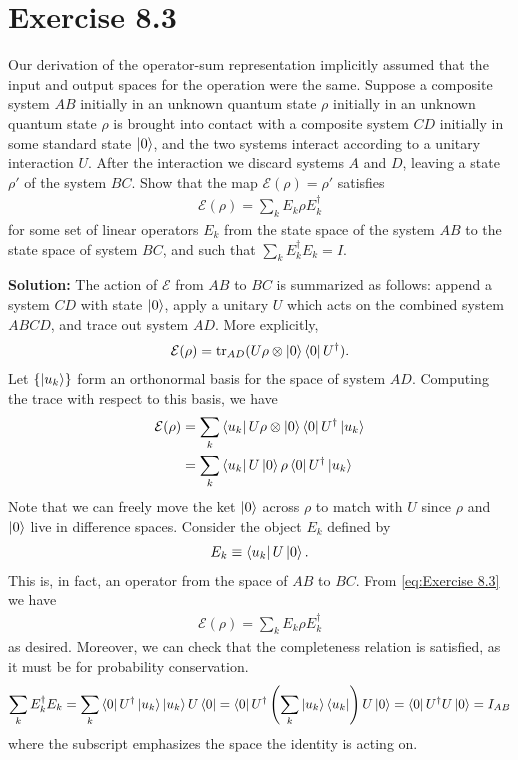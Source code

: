 \documentclass{book}
\newcommand{\mc}[1]{\mathcal{#1}}
\begin{document}
\section*{Exercise 8.3}
    Our derivation of the operator-sum representation implicitly assumed that the input and output spaces for the operation were the same. Suppose a composite system $AB$ initially in an unknown quantum state $\rho$ initially in an unknown quantum state $\rho$ is brought into contact with a composite system $CD$ initially in some standard state $\ket{0}$, and the two systems interact according to a unitary interaction $U$. After the interaction we discard systems $A$ and $D$, leaving a state $\rho'$ of the system $BC$. Show that the map $\mc{E}(\rho) = \rho'$ satisfies
    \begin{align}
        \mc{E}(\rho) = \sum_k E_k \rho E_k^\dagger
    \end{align}
    for some set of linear operators $E_k$ from the state space of the system $AB$ to the state space of system $BC$, and such that $\sum_k E_k^\dagger E_k = I$.
    
    \textbf{Solution:} The action of $\mc{E}$ from $AB$ to $BC$ is summarized as follows: append a system $CD$ with state $\ket{0}$, apply a unitary $U$ which acts on the combined system $ABCD$, and trace out system $AD$. More explicitly,
    \begin{align}
        \mc{E}(\rho) = \tr_{AD}(U \rho \otimes \ket{0}\bra{0} U^\dagger).
    \end{align}
    Let $\{\ket{u_k}\}$ form an orthonormal basis for the space of system $AD$. Computing the trace with respect to this basis, we have
    \begin{align} \label{eq:Exercise 8.3}
    \begin{aligned}
        \mc{E}(\rho) &= \sum_k \bra{u_k}U \rho \otimes \ket{0}\bra{0}U^\dagger \ket{u_k} \\
        &= \sum_k \bra{u_k}U\ket{0}\rho \bra{0}U^\dagger \ket{u_k}
    \end{aligned}
    \end{align}
    Note that we can freely move the ket $\ket{0}$ across $\rho$ to match with $U$ since $\rho$ and $\ket{0}$ live in difference spaces. Consider the object $E_k$ defined by
    \begin{align}
        E_k \equiv \bra{u_k}U\ket{0}.
    \end{align}
    This is, in fact, an operator from the space of $AB$ to $BC$. From \eqref{eq:Exercise 8.3} we have
    \begin{align}
        \mc{E}(\rho) = \sum_k E_k \rho E_k^\dagger
    \end{align}
    as desired. Moreover, we can check that the completeness relation is satisfied, as it must be for probability conservation.
    \begin{align}
        \sum_k E_k^\dagger E_k = \sum_k \bra{0}U^\dagger \ket{u_k}\ket{u_k}U\bra{0} = \bra{0}U^\dagger \left(\sum_k \ket{u_k}\bra{u_k}\right) U\ket{0} = \bra{0}U^\dagger U \ket{0} = I_{AB}
    \end{align}
    where the subscript emphasizes the space the identity is acting on. 
    
\end{document}
